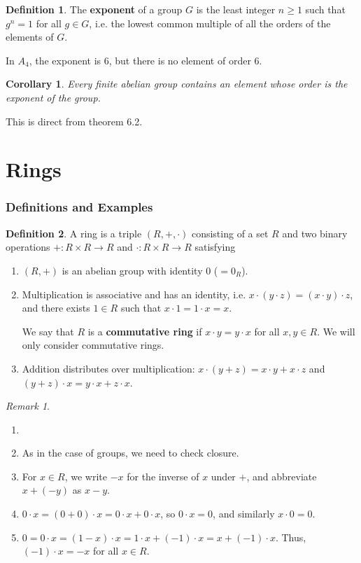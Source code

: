 \documentclass[12pt]{article}
\newtheorem{corollary}{Corollary}[section]
\theoremstyle{definition}
\newtheorem{definition}{Definition}[section]
\theoremstyle{remark}
\newtheorem*{remark}{Remark}
\begin{document}
\begin{definition}
	The \textbf{exponent} of a group $G$ is the least integer $n \geq 1$ such that $g^{n} = 1$ for all $g \in G$, i.e. the lowest common multiple of all the orders of the elements of $G$.
\end{definition}

In $A_4$, the exponent is 6, but there is no element of order 6.

\begin{corollary}
	Every finite abelian group contains an element whose order is the exponent of the group.
\end{corollary}

This is direct from theorem 6.2.

\newpage

\part{Rings}%
\label{prt:rings}

\section{Definitions and Examples}%
\label{sec:definitions_and_examples_rings}

\begin{definition}
	A ring is a triple $(R, +, \cdot)$ consisting of a set $R$ and two binary operations $+ : R \times R \to R$ and $\cdot : R \times R \to R$ satisfying
	\begin{enumerate}[label = (\roman*)]
		\item $(R, +)$ is an abelian group with identity $0$ ($=0_{R}$).
		\item Multiplication is associative and has an identity, i.e. $x \cdot (y \cdot z) = (x \cdot y) \cdot z$, and there exists $1 \in R$ such that $x \cdot 1 = 1 \cdot x = x$.

			We say that $R$ is a \textbf{commutative ring} if $x \cdot y = y \cdot x$ for all $x, y \in R$. We will only consider commutative rings.
		\item Addition distributes over multiplication: $x \cdot (y + z) = x \cdot y + x \cdot z$ and $(y + z) \cdot x = y \cdot x + z \cdot x$.
	\end{enumerate}
\end{definition}
\begin{remark}
	\begin{enumerate}[label = (\roman*)]
		\item[]
		\item As in the case of groups, we need to check closure.
		\item For $x \in R$, we write $-x$ for the inverse of $x$ under $+$, and abbreviate $x + (-y)$ as $x - y$.
		\item $0 \cdot x = (0 + 0)\cdot x = 0 \cdot x + 0 \cdot x$, so $0 \cdot x = 0$, and similarly $x \cdot 0 = 0$.
		\item $0 = 0 \cdot x = (1 - x) \cdot x = 1 \cdot x + (-1) \cdot x = x + (-1) \cdot x$. Thus, $(-1) \cdot x = -x$ for all $x \in R$.
	\end{enumerate}
\end{remark}
\end{document}
